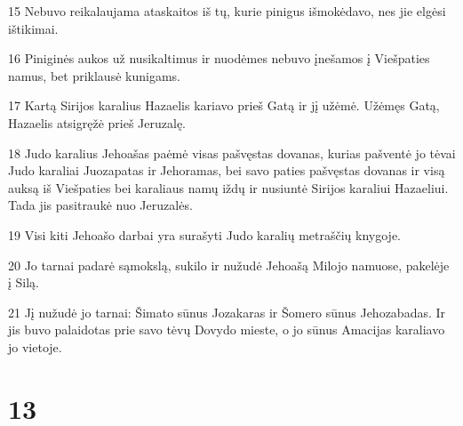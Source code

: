 \par 15 Nebuvo reikalaujama ataskaitos iš tų, kurie pinigus išmokėdavo, nes jie elgėsi ištikimai. 
\par 16 Piniginės aukos už nusikaltimus ir nuodėmes nebuvo įnešamos į Viešpaties namus, bet priklausė kunigams. 
\par 17 Kartą Sirijos karalius Hazaelis kariavo prieš Gatą ir jį užėmė. Užėmęs Gatą, Hazaelis atsigręžė prieš Jeruzalę. 
\par 18 Judo karalius Jehoašas paėmė visas pašvęstas dovanas, kurias pašventė jo tėvai Judo karaliai Juozapatas ir Jehoramas, bei savo paties pašvęstas dovanas ir visą auksą iš Viešpaties bei karaliaus namų iždų ir nusiuntė Sirijos karaliui Hazaeliui. Tada jis pasitraukė nuo Jeruzalės. 
\par 19 Visi kiti Jehoašo darbai yra surašyti Judo karalių metraščių knygoje. 
\par 20 Jo tarnai padarė sąmokslą, sukilo ir nužudė Jehoašą Milojo namuose, pakelėje į Silą. 
\par 21 Jį nužudė jo tarnai: Šimato sūnus Jozakaras ir Šomero sūnus Jehozabadas. Ir jis buvo palaidotas prie savo tėvų Dovydo mieste, o jo sūnus Amacijas karaliavo jo vietoje.



\chapter{13}


